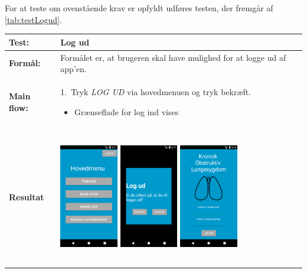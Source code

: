 \noindent
For at teste om ovenstående krav er opfyldt udføres testen, der fremgår af \autoref{tab:testLogud}.

  \begin{longtable}{ | l | p{13cm} |} \hline
    \textbf{Test:} & Log ud \\ \hline
  \textbf{Formål:} & Formålet er, at brugeren skal have mulighed for at logge ud af app’en.
 \\ \hline
 	\textbf{Main flow:} & 1.~Tryk \textit{LOG UD} via hovedmenuen og tryk bekræft.
 	\begin{itemize}
 	\item Grænseflade for log ind vises
 	\end{itemize}	
\\ \hline
\textbf{Resultat} &  \hspace{1.5mm}  \raisebox{-\totalheight}    {\includegraphics[width=0.24\textwidth, height=60mm]{figures/test/logud2}} 
\hspace{5mm}
        \raisebox{-\totalheight}
    {\includegraphics[width=0.24\textwidth, height=60mm]{figures/test/logud3}} 
    \hspace{5mm}
        \raisebox{-\totalheight}
    {\includegraphics[width=0.24\textwidth, height=60mm]{figures/test/logud1}} \vspace{3mm}

\end{longtable}
